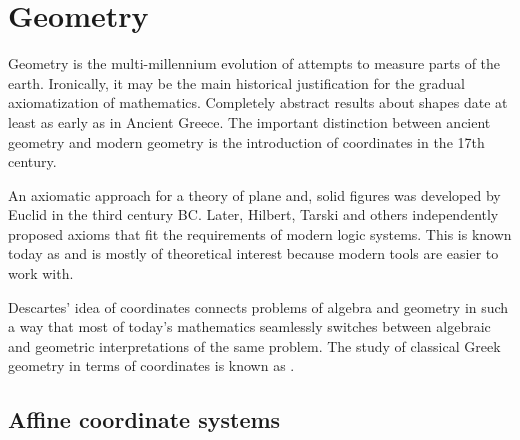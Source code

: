 \section{Geometry}\label{sec:geometry}

\begin{remark}\label{def:coordinates_in_geometry}
  Geometry is the multi-millennium evolution of attempts to measure parts of the earth. Ironically, it may be the main historical justification for the gradual axiomatization of mathematics. Completely abstract results about shapes date at least as early as in Ancient Greece. The important distinction between ancient geometry and modern geometry is the introduction of coordinates in the 17th century.

  An axiomatic approach for a theory of plane and, solid figures was developed by Euclid in the third century BC. Later, Hilbert, Tarski and others independently proposed axioms that fit the requirements of modern logic systems. This is known today as  and is mostly of theoretical interest because modern tools are easier to work with.

  Descartes' idea of coordinates connects problems of algebra and geometry in such a way that most of today's mathematics seamlessly switches between algebraic and geometric interpretations of the same problem. The study of classical Greek geometry in terms of coordinates is known as .
\end{remark}

\subsection{Affine coordinate systems}\label{subsec:affine_coordinate_system}

